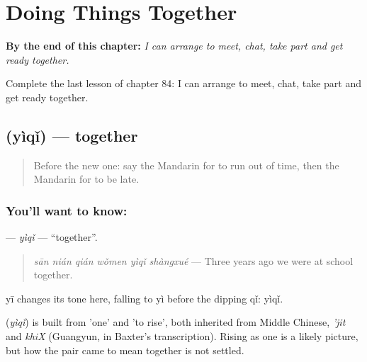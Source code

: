 
\chapter{Doing Things Together}
\label{ch:zh-doing-things-together}

\begin{chapteropening}
\textbf{By the end of this chapter:} \emph{I can arrange to meet, chat, take part and get ready together.}

Complete the last lesson of chapter 84: I can arrange to meet, chat, take part and get ready together.
\end{chapteropening}

\section[\texorpdfstring{\zh{一起} (yìqǐ)}{一起 (yìqǐ)}]{ (yìqǐ) — together}

\label{lesson:ZH-C84-yiqi}



\begin{quote}
Before the new one: say the Mandarin for to run out of time, then the Mandarin for to be late.
\end{quote}

\subsection*{You'll want to know: }
\textbf{} — \emph{yìqǐ} — \textquotedblleft{}together\textquotedblright{}.

\begin{quote}
\textbf{} \emph{sān nián qián wǒmen yìqǐ shàngxué} — Three years ago we were at school together.
\end{quote}

yī changes its tone here, falling to yì before the dipping qǐ: yìqǐ.

\begin{cousinweb}
\textbf{} (\emph{yìqǐ}) is built from  'one' and  'to rise', both inherited from Middle Chinese, \emph{'jit} and \emph{khiX} (Guangyun, in Baxter's transcription). Rising as one is a likely picture, but how the pair came to mean together is not settled.
\end{cousinweb}

